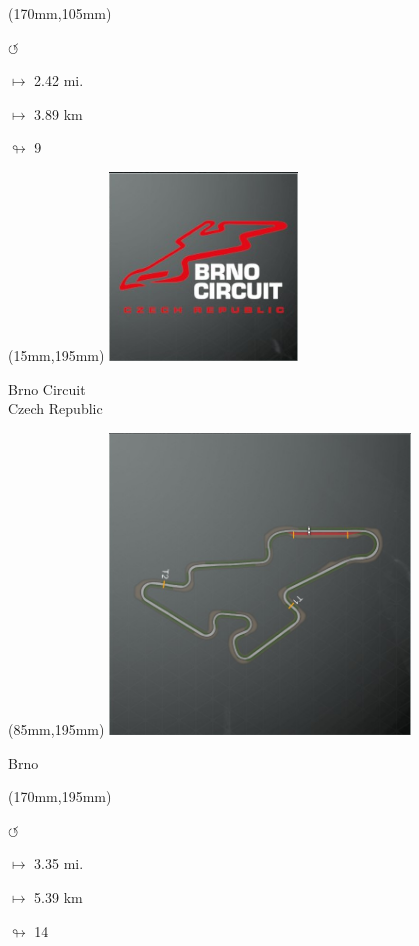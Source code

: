\begin{textblock*}{30mm}(170mm,105mm)%
\par \Huge$\circlearrowleft$
\Large
\par$\mapsto$ 2.42 mi.
\par$\mapsto$ 3.89 km
\par$\looparrowright$ 9
\end{textblock*}
\begin{textblock*}{60mm}(15mm,195mm)%
\includegraphics[width=50mm]{LG/2015-05-20_00075.png}
\par Brno Circuit\\ Czech Republic
\end{textblock*}
\begin{textblock*}{80mm}(85mm,195mm)%
\includegraphics[width=80mm]{TR/2015-05-20_00009.png}
\centerline{Brno}
\end{textblock*}
\begin{textblock*}{30mm}(170mm,195mm)%
\par \Huge$\circlearrowleft$
\Large
\par$\mapsto$ 3.35 mi.
\par$\mapsto$ 5.39 km
\par$\looparrowright$ 14
\end{textblock*}
\null\newpage

